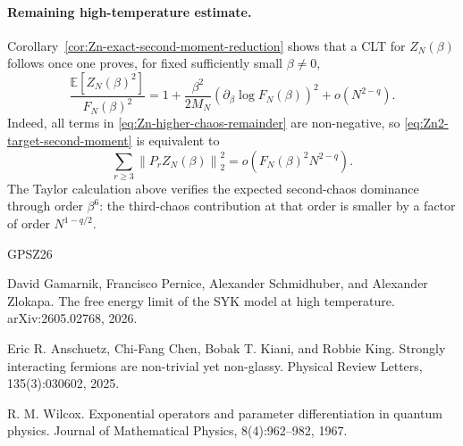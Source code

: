\documentclass[11pt]{article}
\newcommand{\E}{\mathbb{E}}
\newcommand{\norm}[1]{\left\lVert #1\right\rVert}
\begin{document}
\paragraph{Remaining high-temperature estimate.}
Corollary~\ref{cor:Zn-exact-second-moment-reduction} shows that a CLT for
$Z_N(\beta)$ follows once one proves, for fixed sufficiently small
$\beta\neq0$,
\begin{equation}\label{eq:Zn2-target-second-moment}
  \frac{\E[Z_N(\beta)^2]}{F_N(\beta)^2}
  =
  1
  +
  \frac{\beta^2}{2M_N}
  \left(
    \partial_\beta\log F_N(\beta)
  \right)^2
  +
  o\left(N^{2-q}\right).
\end{equation}
Indeed, all terms in \eqref{eq:Zn-higher-chaos-remainder} are non-negative,
so \eqref{eq:Zn2-target-second-moment} is equivalent to
\begin{equation}\label{eq:Zn-higher-chaos-target}
  \sum_{r\geq3}\norm{P_rZ_N(\beta)}_2^2
  =
  o\left(F_N(\beta)^2N^{2-q}\right).
\end{equation}
The Taylor calculation above verifies the expected second-chaos dominance
through order $\beta^6$: the third-chaos contribution at that order is smaller
by a factor of order $N^{1-q/2}$.

\begin{thebibliography}{GPSZ26}

David Gamarnik, Francisco Pernice, Alexander Schmidhuber, and Alexander
Zlokapa.
\newblock The free energy limit of the {SYK} model at high temperature.
\newblock arXiv:2605.02768, 2026.

Eric R. Anschuetz, Chi-Fang Chen, Bobak T. Kiani, and Robbie King.
\newblock Strongly interacting fermions are non-trivial yet non-glassy.
\newblock Physical Review Letters, 135(3):030602, 2025.

R. M. Wilcox.
\newblock Exponential operators and parameter differentiation in quantum physics.
\newblock Journal of Mathematical Physics, 8(4):962--982, 1967.

\end{thebibliography}
\end{document}
